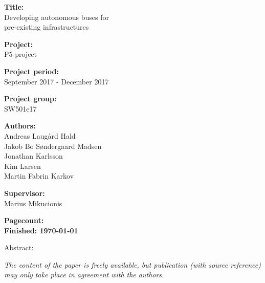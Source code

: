 \begin{minipage}[t]{0.48\textwidth}
\textbf{Title:} \\[5pt]\hspace{2ex}
\hspace*{2ex} Developing autonomous buses for
 \\\hspace*{2ex}
 pre-existing infrastructures

\textbf{Project:} \\[5pt]\bigskip\hspace{2ex}
P5-project

\textbf{Project period:} \\[5pt]\bigskip\hspace{2ex}
September 2017 - December 2017

\textbf{Project group:} \\[5pt]\bigskip\hspace{2ex}
SW501e17

\textbf{Authors:} \\[5pt]\hspace*{2ex}
Andreas Laugård Hald
 \\\hspace*{2ex}
Jakob Bo Søndergaard Madsen
 \\\hspace*{2ex}
Jonathan Karlsson
 \\\hspace*{2ex}
Kim Larsen
 \\\hspace*{2ex}
Martin Fabrin Karkov 



\bigskip

\textbf{Supervisor:} \\[5pt]\hspace*{2ex}
Marius Mikucionis

\vspace*{1cm}

\textbf{Pagecount: \pageref{LastPage}} \\
\textbf{Finished: \today}

\end{minipage}
\hfill
\begin{minipage}[t]{0.483\textwidth}
Abstract: \\[5pt]
\fbox{\parbox{7cm}{\bigskip\bigskip}}
\end{minipage}

\vfill

{\footnotesize\itshape The content of the paper is freely available, but publication (with source reference) may only take place in agreement with the authors.}

